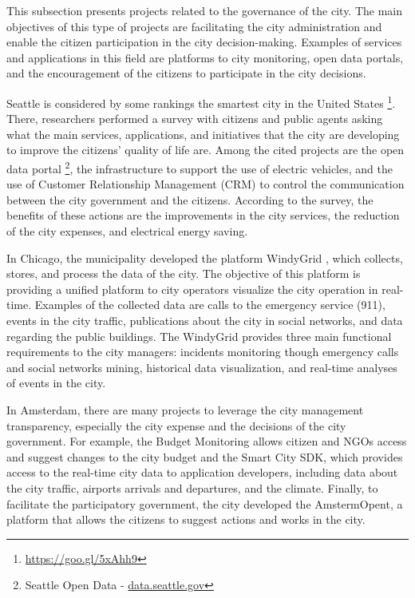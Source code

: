 This subsection presents projects related to the governance of the city. The main objectives of this type of projects are facilitating the city administration and enable the citizen participation in the city decision-making. Examples of services and applications in this field are platforms to city monitoring, open data portals, and the encouragement of the citizens to participate in the city decisions.

Seattle is considered by some rankings the smartest city in the United States \footnote{\url{https://goo.gl/5xAhh9}}.
There, researchers performed a survey \cite{alawadhi2013aspirations} with citizens and public agents asking what the main services, applications, and initiatives that the city are developing to improve the citizens' quality of life are. Among the cited projects are the open data portal \footnote{Seattle Open Data - \url{data.seattle.gov}}, the infrastructure to support the use of electric vehicles, and the use of Customer Relationship Management (CRM) to control the communication between the city government and the citizens. According to the survey, the benefits of these actions are the improvements in the city services, the reduction of the city expenses, and electrical energy saving. 

In Chicago, the municipality developed the platform WindyGrid \cite{thornton13windygrid}, which collects, stores, and process the data of the city. The objective of this platform is providing a unified platform to city operators visualize the city operation in real-time. Examples of the collected data are calls to the emergency service (911), events in the city traffic, publications about the city in social networks, and data regarding the public buildings. The WindyGrid provides three main functional requirements to the city managers: incidents monitoring though emergency calls and social networks mining, historical data visualization, and real-time analyses of events in the city.


In Amsterdam, there are many projects to leverage the city management transparency, especially the city expense and the decisions of the city government. For example, the Budget Monitoring allows citizen and NGOs access and suggest changes to the city budget and the Smart City SDK, which provides access to the real-time city data to application developers, including data about the city traffic, airports arrivals and departures, and the climate. Finally, to facilitate the participatory government, the city developed the AmstermOpent, a platform that allows the citizens to suggest actions and works in the city.

